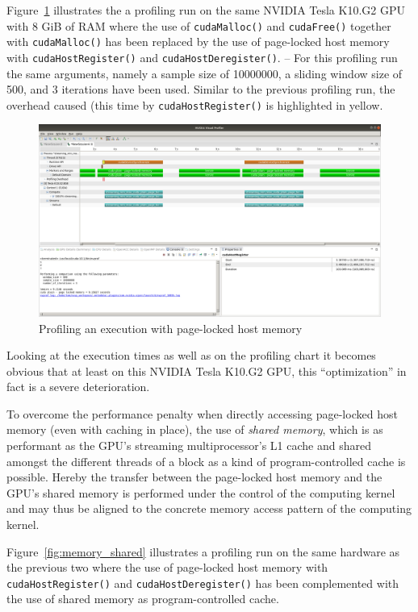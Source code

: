 Figure~\ref{fig:memory_page_locked} illustrates the a profiling run on the same NVIDIA Tesla K10.G2 GPU with 8 GiB of RAM where the use of \texttt{cudaMalloc()} and \texttt{cudaFree()} together with \texttt{cudaMalloc()} has been replaced by the use of page-locked host memory with \texttt{cudaHostRegister()} and \texttt{cudaHostDeregister()}. -- For this profiling run the same arguments, namely a sample size of 10000000, a sliding window size of 500, and 3 iterations have been used. Similar to the previous profiling run, the overhead caused (this time by \texttt{cudaHostRegister()} is highlighted in yellow.

\begin{figure}
    \centering
    \includegraphics[width=0.8\linewidth]{Figures/memory_page_locked}
    \caption{Profiling an execution with page-locked host memory \label{fig:memory_page_locked}}
\end{figure}

Looking at the execution times as well as on the profiling chart it becomes obvious that at least on this NVIDIA Tesla K10.G2 GPU, this ``optimization'' in fact is a severe deterioration.

To overcome the performance penalty when directly accessing page-locked host memory (even with caching in place), the use of \emph{shared memory}, which is as performant as the GPU's streaming multiprocessor's L1 cache and shared amongst the different threads of a block as a kind of program-controlled cache is possible. Hereby the transfer between the page-locked host memory and the GPU's shared memory is performed under the control of the computing kernel and may thus be aligned to the concrete memory access pattern of the computing kernel.

Figure~\ref{fig:memory_shared} illustrates a profiling run on the same hardware as the previous two where the use of page-locked host memory with \texttt{cudaHostRegister()} and \texttt{cudaHostDeregister()} has been complemented with the use of shared memory as program-controlled cache.

